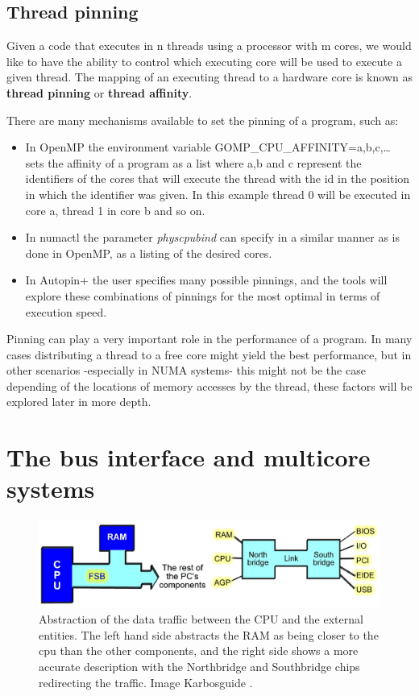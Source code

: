 \subsection{Thread pinning}\label{subsection:pinning}
Given a code that executes in n threads using a processor with m cores, we would like to have the ability to control which executing core will be used to execute a given thread. The mapping of an executing thread to a hardware core is known as \textbf{thread pinning} or \textbf{thread affinity}.

There are many mechanisms available to set the pinning of a program, such as:

\begin{itemize}
	\item In OpenMP the environment variable GOMP\_CPU\_AFFINITY=a,b,c,… sets the affinity of a program as a list where a,b and c represent the identifiers of the cores that will execute the thread with the id in the position in which the identifier was given. In this example thread 0 will be executed in core a, thread 1 in core b and so on.
	\item In numactl the parameter \textit{physcpubind} can specify in a similar manner as is done in OpenMP, as a listing of the desired cores.
	\item In Autopin+ the user specifies many possible pinnings, and the tools will explore these combinations of pinnings for the most optimal in terms of execution speed.
\end{itemize}
Pinning can play a very important role in the performance of a program. In many cases distributing a thread to a free core might yield the best performance, but in other scenarios -especially in NUMA systems- this might not be the case depending of the locations of memory accesses by the thread, these factors will be explored later in more depth. 

\section{The bus interface and multicore systems}\label{section:businterface}
\begin{figure}[ht]
	\centering
		\includegraphics[width=.9\textwidth]{figures/bus-abstraction.eps}
		\caption[Abstraction of the data traffic between the CPU and the external entities]{Abstraction of the data traffic between the CPU and the external entities. The left hand side abstracts the RAM as being closer to the cpu than the other components, and the right side shows a more accurate description with the Northbridge and Southbridge chips redirecting the traffic. Image Karbosguide \cite{pcarch-carbo}. }
		\label{fig:bus-abs}
\end{figure}

